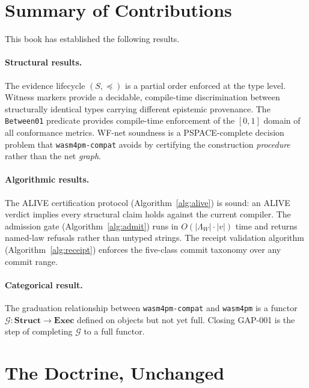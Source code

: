 \section{Summary of Contributions}
\label{sec:conc-summary}

This book has established the following results.

\paragraph{Structural results.}
The evidence lifecycle $(S, \preceq)$ is a partial order enforced at the type
level. Witness markers provide a decidable, compile-time discrimination between
structurally identical types carrying different epistemic provenance. The
\texttt{Between01} predicate provides compile-time enforcement of the
$[0,1]$ domain of all conformance metrics. WF-net soundness is a
PSPACE-complete decision problem that \texttt{wasm4pm-compat} avoids by
certifying the construction \emph{procedure} rather than the net \emph{graph}.

\paragraph{Algorithmic results.}
The ALIVE certification protocol (Algorithm~\ref{alg:alive}) is sound: an
ALIVE verdict implies every structural claim holds against the current
compiler. The admission gate (Algorithm~\ref{alg:admit}) runs in
$O(|\Lambda_W| \cdot |v|)$ time and returns named-law refusals rather than
untyped strings. The receipt validation algorithm
(Algorithm~\ref{alg:receipt}) enforces the five-class commit taxonomy over
any commit range.

\paragraph{Categorical result.}
The graduation relationship between \texttt{wasm4pm-compat} and
\texttt{wasm4pm} is a functor $\mathcal{G} : \mathbf{Struct} \to \mathbf{Exec}$
defined on objects but not yet full. Closing GAP-001 is the step of completing
$\mathcal{G}$ to a full functor.

\section{The Doctrine, Unchanged}
\label{sec:conc-doctrine}

